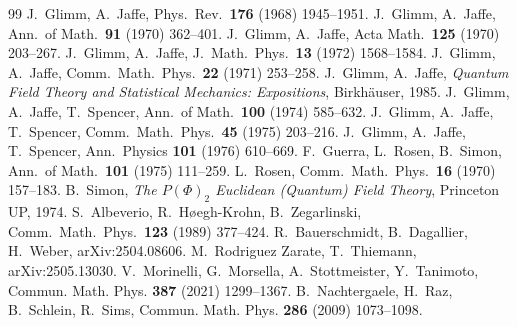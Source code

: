 \documentclass[11pt,a4paper]{article}
\theoremstyle{plain}
\theoremstyle{definition}
\begin{document}
\begin{thebibliography}{99}
 J.~Glimm, A.~Jaffe, Phys.\ Rev.\ \textbf{176} (1968) 1945--1951.
 J.~Glimm, A.~Jaffe, Ann.\ of Math.\ \textbf{91} (1970) 362--401.
 J.~Glimm, A.~Jaffe, Acta Math.\ \textbf{125} (1970) 203--267.
 J.~Glimm, A.~Jaffe, J.\ Math.\ Phys.\ \textbf{13} (1972) 1568--1584.
 J.~Glimm, A.~Jaffe, Comm.\ Math.\ Phys.\ \textbf{22} (1971) 253--258.
 J.~Glimm, A.~Jaffe, \emph{Quantum Field Theory and Statistical Mechanics:
Expositions}, Birkh\"auser, 1985.
 J.~Glimm, A.~Jaffe, T.~Spencer, Ann.\ of Math.\ \textbf{100} (1974) 585--632.
 J.~Glimm, A.~Jaffe, T.~Spencer, Comm.\ Math.\ Phys.\ \textbf{45} (1975) 203--216.
 J.~Glimm, A.~Jaffe, T.~Spencer, Ann.\ Physics \textbf{101} (1976) 610--669.
 F.~Guerra, L.~Rosen, B.~Simon, Ann.\ of Math.\ \textbf{101} (1975) 111--259.
 L.~Rosen, Comm.\ Math.\ Phys.\ \textbf{16} (1970) 157--183.
 B.~Simon, \emph{The $P(\Phi)_2$ Euclidean (Quantum) Field Theory},
Princeton UP, 1974.
 S.~Albeverio, R.~H\o egh-Krohn, B.~Zegarlinski, Comm.\ Math.\ Phys.\ \textbf{123}
(1989) 377--424.
 R.~Bauerschmidt, B.~Dagallier, H.~Weber, arXiv:2504.08606.
 M.~Rodriguez Zarate, T.~Thiemann, arXiv:2505.13030.
 V.~Morinelli, G.~Morsella, A.~Stottmeister, Y.~Tanimoto,
Commun. Math. Phys. \textbf{387} (2021) 1299--1367.
 B.~Nachtergaele, H.~Raz, B.~Schlein, R.~Sims,
Commun. Math. Phys. \textbf{286} (2009) 1073--1098.
\end{thebibliography}
\end{document}
